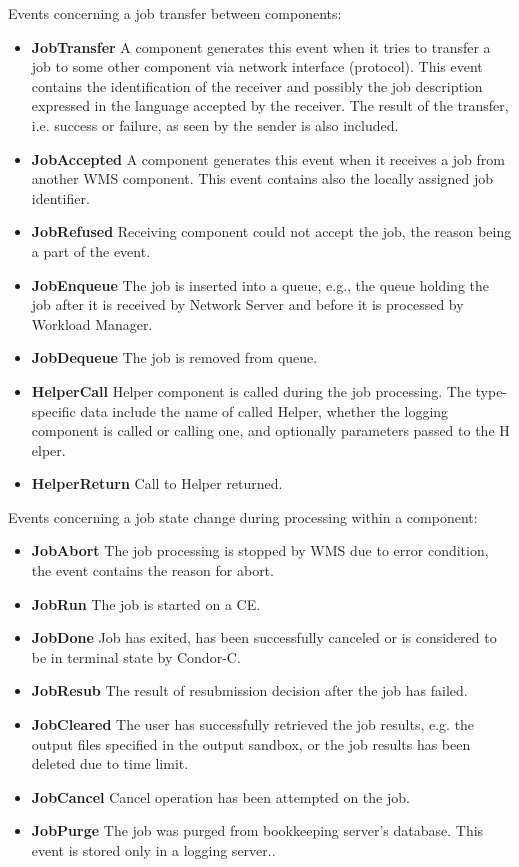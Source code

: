 Events concerning a job transfer between components:
\begin{itemize}
 	\item \textbf{JobTransfer}	A component generates this event when it tries to transfer a job to some 
other component via network interface (protocol). This event contains the identification of the receiver and 
possibly the job description expressed in the language accepted by the receiver. The result of the transfer, i.e. 
success or failure, as seen by the sender is also included.
 	\item \textbf{JobAccepted}	A component generates this event when it receives a job from another WMS 
component. This event contains also the locally assigned job identifier.
 	\item \textbf{JobRefused}	Receiving component could not accept the job, the reason being a part of the event.
 	\item \textbf{JobEnqueue}	The job is inserted into a queue, e.g., the queue holding the job after it is 
received by Network Server and before it is processed by Workload Manager.
 	\item \textbf{JobDequeue}	The job is removed from queue.
 	\item \textbf{HelperCall}	Helper component is called during the job processing. The type-specific data include 
the name of called Helper, whether the logging component is called or calling one, and optionally parameters passed to the H
elper.
 	\item \textbf{HelperReturn}	Call to Helper returned.
 	
\end{itemize}
\smallskip

Events concerning a job state change during processing within a component:

\begin{itemize}
 	\item \textbf{JobAbort}	The job processing is stopped by WMS due to error condition, the event contains the reason 
for abort.
 	\item \textbf{JobRun}		The job is started on a CE.
 	\item \textbf{JobDone}	Job has exited, has been successfully canceled or is considered to be in terminal state 
by Condor-C.
 	\item \textbf{JobResub}	The result of resubmission decision after the job has failed.
 	\item \textbf{JobCleared}	The user has successfully retrieved the job results, e.g. the output files specified 
in the output sandbox, or the job results has been deleted due to time limit.
 	\item \textbf{JobCancel}	Cancel operation has been attempted on the job.
 	\item \textbf{JobPurge}	The job was purged from bookkeeping server's database. This event is stored only in a 
logging server..

\end{itemize}
\smallskip

